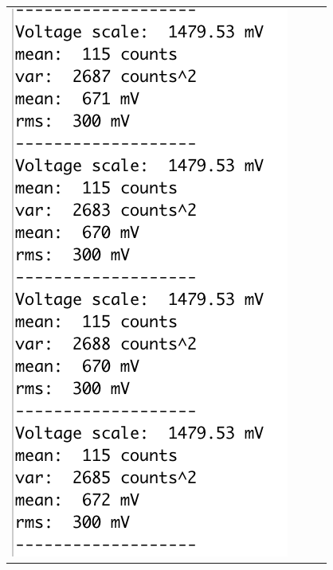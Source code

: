 \documentclass[12pt]{article}
\begin{document}
\begin{figure}[htbp]
\begin{center}
\begin{tabular}{cccc}
{\includegraphics[height=0.30\textheight]{figs/caliba.png}} &

\end{tabular}
\end{center}
\end{figure}
\end{document}
